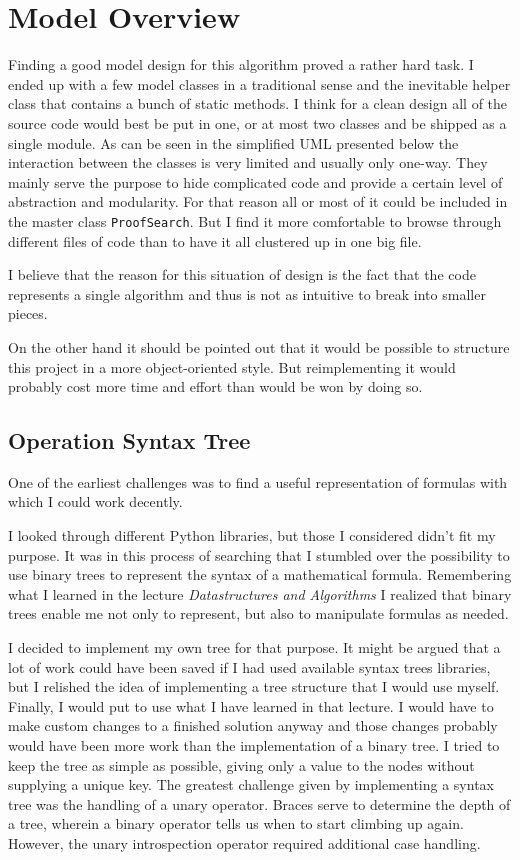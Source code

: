 \section{Model Overview}
Finding a good model design for this algorithm proved a rather hard task. I ended up with a few model classes in a traditional sense and the inevitable helper class that contains a bunch of static methods. I think for a clean design all of the source code would best be put in one, or at most two classes and be shipped as a single module. As can be seen in the simplified UML presented below the interaction between the classes is very limited and usually only one-way. They mainly serve the purpose to hide complicated code and provide a certain level of abstraction and modularity. For that reason all or most of it could be included in the master class \texttt{ProofSearch}. But I find it more comfortable to browse through different files of code than to have it all clustered up in one big file.

I believe that the reason for this situation of design is the fact that the code represents a single algorithm and thus is not as intuitive to break into smaller pieces. 

On the other hand it should be pointed out that it would be possible to structure this project in a more object-oriented style. But reimplementing it would probably cost more time and effort than would be won by doing so.

\subsection{Operation Syntax Tree}
One of the earliest challenges was to find a useful representation of formulas with which I could work decently. 

I looked through different Python libraries, but those I considered didn't fit my purpose. It was in this process of searching that I stumbled over the possibility to use binary trees to represent the syntax of a mathematical formula. Remembering what I learned in the lecture \emph{Datastructures and Algorithms} I realized that binary trees enable me not only to represent, but also to manipulate formulas as needed.

I decided to implement my own tree for that purpose. It might be argued that a lot of work could have been saved if I had used available syntax trees libraries, but I relished the idea of implementing a tree structure that I would use myself. Finally, I would put to use what I have learned in that lecture. I would have to make custom changes to a finished solution anyway and those changes probably would have been more work than the implementation of a binary tree. I tried to keep the tree as simple as possible, giving only a value to the nodes without supplying a unique key. The greatest challenge given by implementing a syntax tree was the handling of a unary operator. Braces serve to determine the depth of a tree, wherein a binary operator tells us when to start climbing up again. However, the unary introspection operator required additional case handling. 

